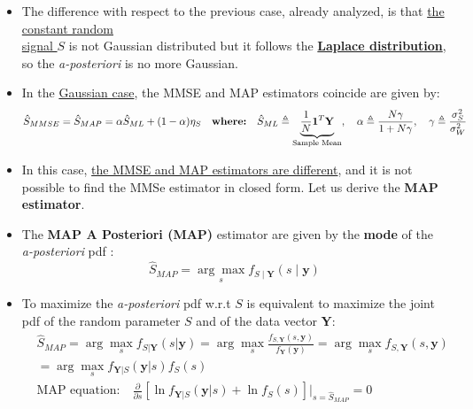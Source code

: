 \begin{itemize}
\subsection{MAP estimation of a constant Laplacian signal in AWGN}
\noindent \textbf{Problem}: find the MAP estimator of constant random signal S in AWGN.
\[
\underbrace{Y_i = S + W_i \quad i = 0, 1, 2, \cdots, N-1;}_{\text{Model of the observed data}},  \qquad \underbrace{S \in \mathcal{L}(\lambda)}_{\text{Random constant signal}}, \qquad\underbrace{W_i \in \mathcal{N}\left(0, \sigma_W^2\right), \quad \{W_i\}_{i=0}^{N-1} \text{ IID}}_{\text{Noise samples}}
\]
\item The difference with respect to the previous case, already analyzed, is that \underline{the constant random}\\ \noindent \underline{signal \(S\)} is not Gaussian distributed but it follows the \underline{\textbf{Laplace distribution}}, so the \textit{a-posteriori} is no more Gaussian.

\item In the \underline{Gaussian case}, the MMSE and MAP estimators coincide are given by:
\[\hat{S}_{MMSE} = \hat{S}_{MAP} = \alpha \hat{S}_{ML} + (1 - \alpha)\eta_S \quad \text{\textbf{{where:}}} \quad \hat{S}_{ML} \triangleq \underbrace{\frac{1}{N} \mathbf{1}^T \mathbf{Y}}_{\text{Sample Mean}}, \quad \alpha \triangleq \frac{N\gamma}{1 + N\gamma}, \quad \gamma \triangleq \frac{\sigma_S^2}{\sigma_W^2}\]
\item In this case, \underline{the MMSE and MAP estimators are different}, and it is not possible to find the MMSe estimator in closed form. Let us derive the \textbf{MAP estimator}.
\item The \textbf{MAP A Posteriori (MAP)} estimator are given by the \textbf{mode} of the \textit{a-posteriori} pdf :
\[
\hat{S}_{MAP}=\underset{s}{\arg\max} f_{S\mid\textbf{Y}}(s\mid\textbf{y})
\]
\item To maximize the \textit{a-posteriori} pdf w.r.t \(S\) is equivalent to maximize the joint pdf of the random parameter \(S\) and of the data vector \textbf{Y}:
\begin{align*}
&\hat{S}_{MAP} = \arg \max_s f_{S|\mathbf{Y}}(s|\mathbf{y}) = \arg \max_s \frac{f_{S,\mathbf{Y}}(s,\mathbf{y})}{f_{\mathbf{Y}}(\mathbf{y})} = \arg \max_s f_{S,\mathbf{Y}}(s,\mathbf{y}) \\[5pt]
&= \arg \max_s f_{\mathbf{Y}|S}(\mathbf{y}|s) f_S(s) \\[5pt]
&\text{MAP equation:}  \quad \frac{\partial}{\partial s} \left[ \ln f_{\mathbf{Y}|S}(\mathbf{y}|s) + \ln f_S(s) \right] \bigg|_{s=\hat{S}_{MAP}} = 0
\end{align*}




\end{itemize}
